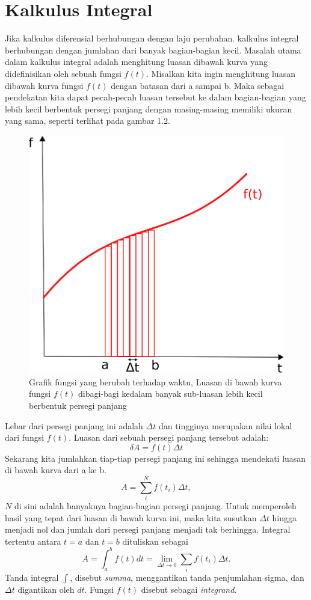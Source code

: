 \section{Kalkulus Integral}
Jika kalkulus diferensial berhubungan dengan laju perubahan. kalkulus integral berhubungan dengan jumlahan dari banyak bagian-bagian kecil. Masalah utama dalam kalkulus integral adalah menghitung luasan dibawah kurva yang didefinisikan oleh sebuah fungsi $f(t)$. Misalkan kita ingin menghitung luasan dibawah kurva fungsi $f(t)$ dengan batasan dari a sampai b. Maka sebagai pendekatan kita dapat pecah-pecah luasan tersebut ke dalam bagian-bagian yang lebih kecil berbentuk persegi panjang dengan masing-masing memiliki ukuran yang sama, seperti terlihat pada gambar 1.2.
\begin{figure}[!h]
\centering
\includegraphics[scale=0.6]{pict/integralgraph.eps}
\caption{Grafik fungsi yang berubah terhadap waktu, Luasan di bawah kurva fungsi $f(t)$ dibagi-bagi kedalam banyak sub-luasan lebih kecil berbentuk persegi panjang}\label{integral}
\end{figure}
Lebar dari persegi panjang ini adalah $\Delta t$ dan tingginya merupakan nilai lokal dari fungsi $f(t)$. Luasan dari sebuah persegi panjang tersebut adalah:
\[
\delta A=f(t)\Delta t
\]
Sekarang kita jumlahkan tiap-tiap persegi panjang ini sehingga mendekati luasan di bawah kurva dari a ke b.
\[
A=\sum^N_i f(t_i)\Delta t,
\]
$N$ di sini adalah banyaknya bagian-bagian persegi panjang. Untuk memperoleh hasil yang tepat dari luasan di bawah kurva ini, maka kita susutkan $\Delta t$ hingga menjadi nol dan jumlah dari persegi panjang menjadi tak berhingga. Integral tertentu antara $t=a$ dan $t=b$ dituliskan sebagai
\[
A=\int^b_a f(t) dt =\lim_{\Delta t \rightarrow 0} \sum_i f(t_i) \Delta t.
\]
Tanda integral $\int$, disebut \textit{summa}, menggantikan tanda penjumlahan sigma, dan $\Delta t$ digantikan oleh $dt$. Fungsi $f(t)$ disebut sebagai \textit{integrand}.


